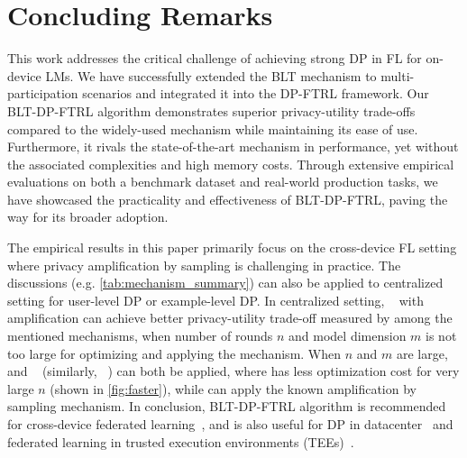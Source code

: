 \section{Concluding Remarks}
\vspace{-0.2cm}
This work addresses the critical challenge of achieving strong DP in FL for on-device LMs. We have successfully extended the BLT mechanism to multi-participation scenarios and integrated it into the DP-FTRL framework. Our BLT-DP-FTRL algorithm demonstrates superior privacy-utility trade-offs compared to the widely-used \treeagg mechanism while maintaining its ease of use. Furthermore, it rivals the state-of-the-art \bandmf mechanism in performance, yet without the associated complexities and high memory costs. Through extensive empirical evaluations on both a benchmark dataset and real-world production tasks, we have showcased the practicality and effectiveness of BLT-DP-FTRL, paving the way for its broader adoption. 

The empirical results in this paper primarily focus on the cross-device FL setting where privacy amplification by sampling is challenging in practice. The discussions (e.g. \cref{tab:mechanism_summary}) can also be applied to centralized setting for user-level DP or example-level DP. In centralized setting, \bandmf~\citep{choquette2023amplified} with amplification can achieve better privacy-utility trade-off measured by \rmsloss among the mentioned mechanisms, when number of rounds $n$ and model dimension $m$ is not too large for optimizing and applying the mechanism. When $n$ and $m$ are large, \blt and \bandtoep~\citep{mckenna2024scaling} (similarly, \bandfhu~\citep{kalinin2024banded}) can both be applied, where \blt has less optimization cost for very large $n$ (shown in \cref{fig:faster}), while \bandtoep can apply the known amplification by sampling mechanism. In conclusion, BLT-DP-FTRL algorithm is recommended for cross-device federated learning~\citep{xu2023federated,kairouz2019advances}, and is also useful for DP in datacenter~\citep{ponomareva2023dpfy,xu2022learning,charles2024fine} and federated learning in trusted execution environments (TEEs)~\citep{daly2024federated,eichner2024confidential}.